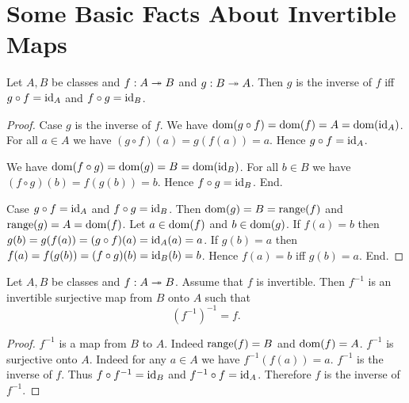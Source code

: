 \documentclass[10pt]{article}
\begin{document}
  \section{Some Basic Facts About Invertible Maps}

  \begin{forthel}
    \begin{proposition}
      Let $A, B$ be classes and $f : A \twoheadrightarrow B$ and $g : B \twoheadrightarrow A$.
      Then $g$ is the inverse of $f$ iff $g \circ f = \textrm{id}_{A}$ and $f \circ g =
      \textrm{id}_{B}$.
    \end{proposition}
    \begin{proof}
      Case $g$ is the inverse of $f$.
        We have
        $\operatorname{dom}(g \circ f)
          = \operatorname{dom}(f)
          = A
          = \operatorname{dom}(\textrm{id}_{A})$.
        For all $a \in A$ we have
        $(g \circ f)(a)
          = g(f(a))
          = a$.
        Hence $g \circ f = \textrm{id}_{A}$.

        We have
        $\operatorname{dom}(f \circ g)
          = \operatorname{dom}(g)
          = B
          = \operatorname{dom}(\textrm{id}_{B})$.
        For all $b \in B$ we have
        $(f \circ g)(b)
          = f(g(b))
          = b$.
        Hence $f \circ g = \textrm{id}_{B}$.
      End.

      Case $g \circ f = \textrm{id}_{A}$ and $f \circ g = \textrm{id}_{B}$.
        Then $\operatorname{dom}(g)
          = B
          = \textrm{range}(f)$
        and $\textrm{range}(g)
          = A
          = \operatorname{dom}(f)$.
        Let $a \in \operatorname{dom}(f)$ and $b \in \operatorname{dom}(g)$.
        If $f(a) = b$ then
        $g(b)
          = g(f(a))
          = (g \circ f)(a)
          = \textrm{id}_{A}(a)
          = a$.
        If $g(b) = a$ then
        $f(a)
          = f(g(b))
          = (f \circ g)(b)
          = \textrm{id}_{B}(b)
          = b$.
        Hence $f(a) = b$ iff $g(b) = a$.
      End.
    \end{proof}
  \end{forthel}

  \begin{forthel}
    \begin{proposition}
      Let $A, B$ be classes and $f : A \twoheadrightarrow B$.
      Assume that $f$ is invertible.
      Then $f^{-1}$ is an invertible surjective map from $B$ onto $A$ such that
      \[ (f^{-1})^{-1} = f. \]
    \end{proposition}
    \begin{proof}
      $f^{-1}$ is a map from $B$ to $A$.
      Indeed $\textrm{range}(f) = B$ and $\operatorname{dom}(f) = A$.
      $f^{-1}$ is surjective onto $A$.
      Indeed for any $a \in A$ we have $f^{-1}(f(a)) = a$.
      $f^{-1}$ is the inverse of $f$.
      Thus $f \circ f^{-1} = \textrm{id}_{B}$ and $f^{-1} \circ f = \textrm{id}_{A}$.
      Therefore $f$ is the inverse of $f^{-1}$.
    \end{proof}
  \end{forthel}
\end{document}
